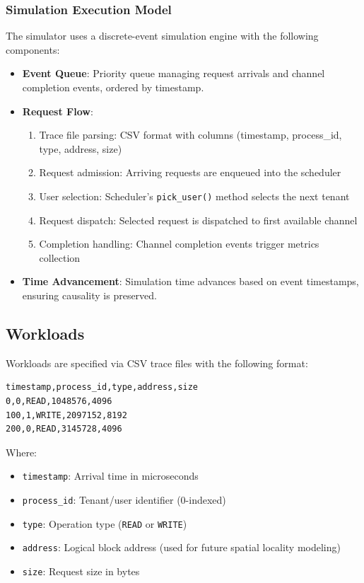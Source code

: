\documentclass[11pt]{article}
\begin{document}
\subsubsection{Simulation Execution Model}

The simulator uses a discrete-event simulation engine with the following components:

\begin{itemize}
    \item \textbf{Event Queue}: Priority queue managing request arrivals and channel completion events, ordered by timestamp.
    \item \textbf{Request Flow}: 
    \begin{enumerate}
        \item Trace file parsing: CSV format with columns (timestamp, process\_id, type, address, size)
        \item Request admission: Arriving requests are enqueued into the scheduler
        \item User selection: Scheduler's \texttt{pick\_user()} method selects the next tenant
        \item Request dispatch: Selected request is dispatched to first available channel
        \item Completion handling: Channel completion events trigger metrics collection
    \end{enumerate}
    \item \textbf{Time Advancement}: Simulation time advances based on event timestamps, ensuring causality is preserved.
\end{itemize}

\subsection{Workloads}

Workloads are specified via CSV trace files with the following format:
\begin{verbatim}
timestamp,process_id,type,address,size
0,0,READ,1048576,4096
100,1,WRITE,2097152,8192
200,0,READ,3145728,4096
\end{verbatim}

Where:
\begin{itemize}
    \item \texttt{timestamp}: Arrival time in microseconds
    \item \texttt{process\_id}: Tenant/user identifier (0-indexed)
    \item \texttt{type}: Operation type (\texttt{READ} or \texttt{WRITE})
    \item \texttt{address}: Logical block address (used for future spatial locality modeling)
    \item \texttt{size}: Request size in bytes
\end{itemize}
\end{document}
